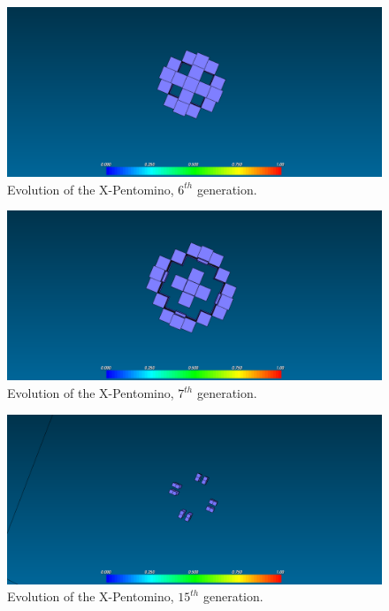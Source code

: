\begin{figure}[H]
	\centering
	\includegraphics[scale=0.3]{pentominoes_ss/x_6.png}
	\caption{Evolution of the X-Pentomino, $6^{th}$ generation.}
	\label{fig:ss-pent:x-6}
\end{figure}

\begin{figure}[H]
	\centering
	\includegraphics[scale=0.3]{pentominoes_ss/x_7.png}
	\caption{Evolution of the X-Pentomino, $7^{th}$ generation.}
	\label{fig:ss-pent:x-7}
\end{figure}

\begin{figure}[H]
	\centering
	\includegraphics[scale=0.3]{pentominoes_ss/x_15.png}
	\caption{Evolution of the X-Pentomino, $15^{th}$ generation.}
	\label{fig:ss-pent:x-15}
\end{figure}

